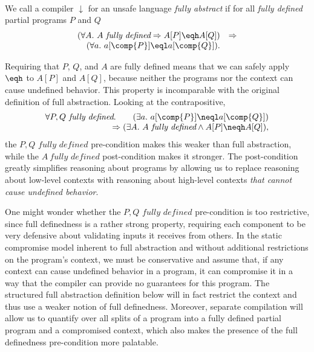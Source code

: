 \documentclass[10pt, conference, compsocconf, letterpaper, times]{IEEEtran}
\begin{document}
\begin{defn}\label{defn:lfa}~\\
  We call a compiler $\downarrow$ for an unsafe language {\em fully
    abstract} if for all {\em fully defined} partial programs $P$ and
  $Q$\[
\begin{array}{rl}
(\forall A.~ A~\textit{fully defined} \Rightarrow A[P] \eqh A[Q])&\Rightarrow\\
(\forall a.~ a[\comp{P}] \eql a[\comp{Q}]).
\end{array}
\]
\end{defn}

Requiring that $P$, $Q$, and $A$ are fully defined means that we can safely
apply $\eqh$ to $A[P]$ and $A[Q]$, because neither the programs nor
the context can cause undefined behavior.
This property is incomparable with the original definition of full
abstraction.
Looking at the contrapositive,
\[
\begin{array}{r}
\forall P, Q\textit{ fully defined}.\qquad
   (\exists a.~ a[\comp{P}] \neql a[\comp{Q}]) \\
   \Rightarrow(\exists A.~ A~\textit{fully defined} \wedge A[P] \neqh A[Q]),
\end{array}
\]
the $P, Q\textit{ fully defined}$ pre-condition makes this weaker than
full abstraction, while the $A~\textit{fully defined}$ post-condition makes it stronger.
The post-condition greatly simplifies reasoning about programs 
by allowing us to replace reasoning about low-level contexts with
reasoning about high-level contexts {\em that cannot cause undefined
behavior}.

One might wonder whether the
$P, Q\textit{ fully defined}$ pre-condition is too restrictive,
since full definedness is a rather strong property, requiring each 
component to be very defensive about validating inputs it receives from
others.
In the static compromise model inherent to full abstraction and
without additional restrictions on the program's context, we must 
be conservative and assume that, if any context can cause
undefined behavior in a program, it can compromise it in a way that the
compiler can provide no guarantees for this program.
The structured full abstraction definition below will in fact restrict
the context and thus use a weaker notion of full definedness.
Moreover, separate compilation will allow us to quantify over all splits of a
program into a fully defined partial program and a compromised
context, which also makes the presence of the full definedness
pre-condition more palatable.
\end{document}
